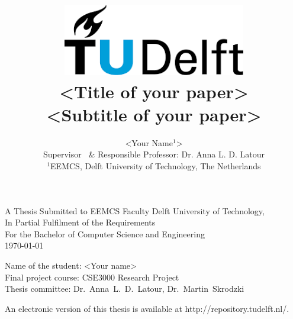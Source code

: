 \title{
    \includegraphics[width=8cm, keepaspectratio]{tudelftlogo.png}\\
    \vspace*{2cm}
    \textbf{
        \textless Title of your paper\textgreater\\
        {\large \textless Subtitle of your paper\textgreater}
    }\\
    \vspace*{1cm}
}

\author{
    \textless Your Name$^1$\textgreater\\
    \hfill \break
    Supervisor \ \& Responsible Professor: Dr. Anna L. D. Latour\\
    \affiliations
    {\large 
        \hfill \break
        $^1$EEMCS, Delft University of Technology, The Netherlands
    }\\
}

\maketitle

\let\clearpagebackup\clearpage
\renewcommand{\clearpage}{ }

\onecolumn

\vspace*{2cm}
\begin{center}
    A Thesis Submitted to EEMCS Faculty Delft University of Technology,\\
    In Partial Fulfilment of the Requirements\\
    For the Bachelor of Computer Science and Engineering\\
    \today
\end{center}

\vspace*{3cm}

\noindent
{\small
Name of the student: \textless Your name\textgreater\\
Final project course: CSE3000 Research Project\\
Thesis committee: Dr.\ Anna\ L.\ D.\ Latour, Dr.\ Martin\ Skrodzki\\
}
\vfill

\begin{center}
    An electronic version of this thesis is available at http://repository.tudelft.nl/.
\end{center}

\twocolumn
\let\clearpage\clearpagebackup  
\clearpage